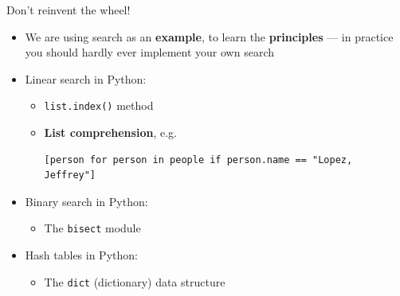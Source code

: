 \begin{frame}[fragile]{Don't reinvent the wheel!}
	\begin{itemize}
		\pause\item We are using search as an \textbf{example}, to learn the \textbf{principles} --- in practice
			you should hardly ever implement your own search
		\pause\item Linear search in Python:
			\begin{itemize}
				\pause\item \lstinline{list.index()} method
				\pause\item \textbf{List comprehension}, e.g.
					\begin{lstlisting}
[person for person in people if person.name == "Lopez, Jeffrey"]
					\end{lstlisting}
			\end{itemize}
		\pause\item Binary search in Python:
			\begin{itemize}
				\pause\item The \lstinline{bisect} module
			\end{itemize}
		\pause\item Hash tables in Python:
			\begin{itemize}
				\pause\item The \lstinline{dict} (dictionary) data structure
			\end{itemize}
	\end{itemize}
\end{frame}
